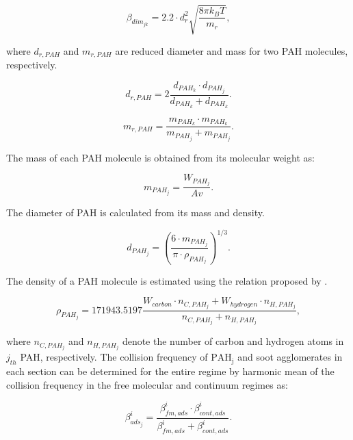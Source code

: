 \begin{equation}
	\beta_{dim_{jk}}=
	2.2 \cdot d^2_{r} \sqrt{\frac{8 \pi k_B T}{m_{r}}},
	\label{eqn:betadim}
\end{equation}

 \noindent where ${d_{r,PAH}}$ and ${m_{r,PAH}}$ are reduced diameter and mass for two PAH molecules, respectively.

\begin{equation}
	d_{r,PAH}=
	2\frac{d_{PAH_k}\cdot d_{PAH_j}}{d_{PAH_k}+d_{PAH_k}}.
	\label{eqn:drPAH}
\end{equation}

\begin{equation}
	m_{r,PAH}=
	\frac{m_{PAH_k}\cdot m_{PAH_k}}{m_{PAH_j}+ m_{PAH_j}}.
	\label{eqn:mrPAH}
\end{equation}

The mass of each PAH molecule is obtained from its molecular weight as:

\begin{equation}
	m_{PAH_j}=
	\frac{W_{PAH_j}}{Av}.
	\label{eqn:mPAH}
\end{equation}

The diameter of PAH is calculated from its mass and density.

\begin{equation}
	d_{PAH_j}=
	\left(
	\frac{6\cdot m_{PAH_j}}{\pi\cdot\rho_{PAH_j}}
	\right)^{1/3}.
	\label{eqn:dPAH}
\end{equation}

The density of a PAH molecule is estimated using the relation proposed by \citet{johansson2016formation}.

\begin{equation}
	\rho_{PAH_j}= 
	171943.5197
	\frac{W_{carbon}\cdot n_{C,PAH_j}+W_{hydrogen}\cdot n_{H,PAH_j}}
	{n_{C,PAH_j}+n_{H,PAH_j}},
	\label{eqn:rhoPAH}
\end{equation}

\noindent where ${n_{C,PAH_j}}$ and ${n_{H,PAH_j}}$ denote the number of carbon and hydrogen atoms in $j_{th}$ PAH, respectively. The collision frequency of $\mathrm{PAH_j}$ and soot agglomerates in each section can be determined for the entire regime by harmonic mean of the collision frequency in the free molecular and continuum regimes as:

\begin{equation}
	\beta^i_{ads_j}=
	\frac{\beta^i_{fm, ads}\cdot \beta^i_{cont, ads}}
	{\beta^i_{fm, ads}+\beta^i_{cont, ads}}.
	\label{eqn:betahmads}
\end{equation}

